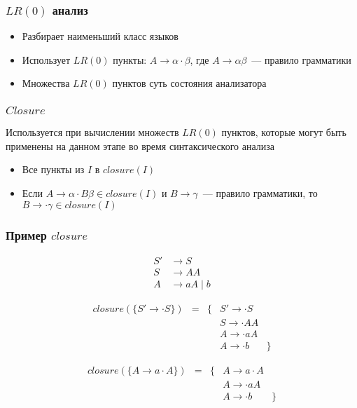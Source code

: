 \documentclass{beamer}
\newcommand{\lritem}[3]{#1 \to #2 \cdot #3}
\begin{document}
\begin{frame}[fragile]
  \transwipe[direction=90]
  \frametitle{$LR(0)$ анализ}

  \begin{itemize}
    \item Разбирает наименьший класс языков
    \item Использует $LR(0)$ пункты: $\lritem{A}{\alpha}{\beta}$, где $A \to \alpha \beta$~--- правило грамматики
    \item Множества $LR(0)$ пунктов суть состояния анализатора
  \end{itemize}

\end{frame}

\begin{frame}[fragile]
  \transwipe[direction=90]
  \frametitle{$Closure$}
  Используется при вычислении множеств $LR(0)$ пунктов, которые могут быть применены на данном этапе во время синтаксического анализа

  \begin{itemize}
    \item Все пункты из $I$ в $closure(I)$
    \item Если $\lritem{A}{\alpha}{B \beta} \in closure(I) \text{ и } B \to \gamma$~--- правило грамматики, то
    $\lritem{B}{}{\gamma} \in closure(I)$
  \end{itemize}
\end{frame}

\begin{frame}[fragile]
  \transwipe[direction=90]
  \frametitle{Пример $closure$}

  \begin{align*}
    S' &\to S \\
    S  &\to A A \\
    A  &\to a A \mid b
  \end{align*}

  \[
  \begin{array}{rcclr}
    closure(\{\lritem{S'}{}{S}\}) & = & \{ &\lritem{S'}{}{S} & \\
                                  &   &    &\lritem{S}{}{AA} & \\
                                  &   &    &\lritem{A}{}{aA} & \\
                                  &   &    &\lritem{A}{}{b}  &\}
  \end{array}
  \]

  \[
  \begin{array}{rcclr}
    closure(\{\lritem{A}{a}{A}\}) & = & \{ & \lritem{A}{a}{A} & \\
                                  &   &    & \lritem{A}{}{aA} & \\
                                  &   &    & \lritem{A}{}{b}  & \}
  \end{array}
  \]

\end{frame}
\end{document}
